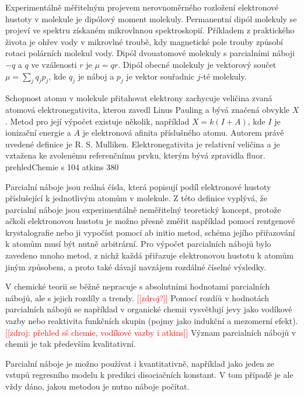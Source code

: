 \documentclass[
  color, %
  table, %
  lof,   %
  lot,   %
]{fithesis3}
\newcommand\fixme[1]{\textcolor{red}{[[#1]]}}
\begin{document}
Experimentálně měřitelným projevem nerovnoměrného rozložení elektronové hustoty v molekule je dipólový moment molekuly. Permanentní dipól molekuly se projeví ve spektru získaném mikrovlnnou spektroskopií. Příkladem z praktického života je ohřev vody v mikrovlné troubě, kdy magnetické pole trouby způsobí rotaci polárních molekul vody. Dipól dvouatomové molekuly s parcialními náboji $-q$ a $q$ ve vzálenosti $r$ je $\mu = qr$. Dipól obecné molekuly je vektorový součet $\mu = \sum_j q_j p_j$, kde $q_j$ je náboj a $p_j$ je vektor souřadnic $j$-té molekuly.

Schopnost atomu v molekule přitahovat elektrony zachycuje veličina zvaná atomová elektronegativita, kterou zavedl Linus Pauling a bývá značená obvykle $X$. Metod pro její výpočet existuje několik, například $X = k(I+A)$, kde $I$ je ionizační energie a $A$ je elektronová afinita příslušného atomu. Autorem právě uvedené definice je R. S. Mulliken. Elektronegativita je relativní veličina a je vztažena ke zvolenému referenčnímu prvku, kterým bývá zpravidla fluor. prehledChemie s 104 atkins 380

Parcialní náboje jsou reálná čísla, která popisují podíl elektronové hustoty příslušející k jednotlivým atomům v molekule. Z této definice vyplývá, že parcialní náboje jsou experimentálně neměřitelný teoretický koncept, protože ačkoli elektronovou hustotu je možno přesně změřit například pomocí rentgenové krystalografie nebo ji vypočíst pomocí ab initio metod, schéma jejího přiřazování k atomům musí být nutně arbitrární. Pro výpočet parcialních nábojů bylo zavedeno mnoho metod, z nichž každá přiřazuje elektronovou hustotu k atomům jiným způsobem, a proto také dávají navzájem rozdálné číselné výsledky.

V chemické teorii se běžně nepracuje s absolutními hodnotami parcialních nábojů, ale s jejich rozdíly a trendy. \fixme{zdroj?} Pomocí rozdíů v hodnotách parcialních nábojů se například v organické chemii vysvětlují jevy jako vodíkové vazby nebo reaktivita funkčních skupin (pojmy jako indukční a mezomerní efekt). \fixme{zdroj: přehled sš chemie, vodíkové vazby i atkins} Význam parcialních nábojů v chemii je tak především kvalitativní.

Parcialní náboje je možno používat i kvantitativně, například jako jeden ze vstupů regresního modelu k predikci disociačních konstant. V tom případě je ale vždy dáno, jakou metodou je nutno náboje počítat.

\end{document}
